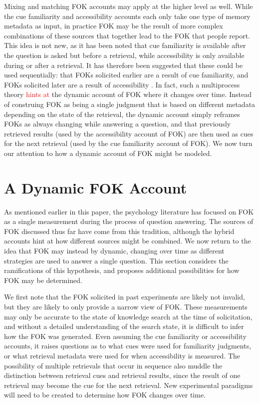 \documentclass[10pt,letterpaper]{article}
\newcommand{\fixme}[2][]{#2}
\renewcommand{\fixme}[2][]{\textcolor{red}{#2}}
\begin{document}
Mixing and matching FOK accounts may apply at the higher level as well.
While the cue familiarity and accessibility accounts each only take one type of memory metadata as input, in practice FOK may be the result of more complex combinations of these sources that together lead to the FOK that people report.
This idea is not new, as it has been noted that cue familiarity is available after the question is asked but before a retrieval, while accessibility is only available during or after a retrieval.
It has therefore been suggested that these could be used sequentially: that FOKs solicited earlier are a result of cue familiarity, and FOKs solicited later are a result of accessibility \cite{Florer2000FeelingsOfKnowing,Koriat2001TheCombinedContributions}.
In fact, such a multiprocess theory \fixme[is in line with?]{hints at} the dynamic account of FOK where it changes over time.
Instead of construing FOK as being a single judgment that is based on different metadata depending on the state of the retrieval, the dynamic account simply reframes FOKs as always changing while answering a question, and that previously retrieved results (used by the accessibility account of FOK) are then used as cues for the next retrieval (used by the cue familiarity account of FOK).
We now turn our attention to how a dynamic account of FOK might be modeled.

\section{A Dynamic FOK Account}

As mentioned earlier in this paper, the psychology literature has focused on FOK as a single measurement during the process of question answering.
The sources of FOK discussed thus far have come from this tradition, although the hybrid accounts hint at how different sources might be combined. 
We now return to the idea that FOK may instead by dynamic, changing over time as different strategies are used to answer a single question.
This section considers the ramifications of this hypothesis, and proposes additional possibilities for how FOK may be determined.

We first note that the FOK solicited in past experiments are likely not invalid, but they are likely to only provide a narrow view of FOK.
These measurements may only be accurate to the state of knowledge search at the time of solicitation, and without a detailed understanding of the search state, it is difficult to infer how the FOK was generated.
Even assuming the cue familiarity or accessibility accounts, it raises questions as to what cues were used for familiarity judgments, or what retrieval metadata were used for when accessibility is measured.
The possibility of multiple retrievals that occur in sequence also muddle the distinction between retrieval cues and retrieval results, since the result of one retrieval may become the cue for the next retrieval.
New experimental paradigms will need to be created to determine how FOK changes over time.
\end{document}

